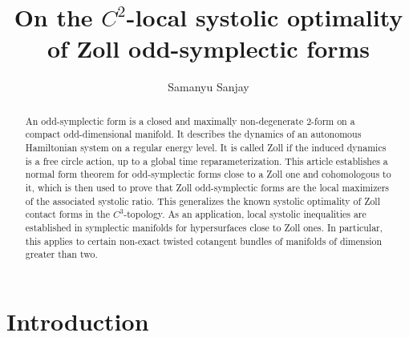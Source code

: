 \documentclass[11pt]{amsart}
\title[Systolic inequalities for odd-symplectic forms]{On the $C^2$-local systolic optimality of Zoll odd-symplectic forms}
\author{Samanyu Sanjay}
\theoremstyle{plain}
\theoremstyle{definition}
\theoremstyle{remark}
\begin{document}
\begin{abstract}
An odd-symplectic form is a closed and maximally non-degenerate $2$-form on a compact odd-dimensional manifold. It describes the dynamics of an autonomous Hamiltonian system on a regular energy level. It is called Zoll if the induced dynamics is a free circle action, up to a global time reparameterization. This article establishes a normal form theorem for odd-symplectic forms close to a Zoll one and cohomologous to it, which is then used to prove that Zoll odd-symplectic forms are the local maximizers of the associated systolic ratio. This generalizes the known systolic optimality of Zoll contact forms in the $C^3$-topology. As an application, local systolic inequalities are established in symplectic manifolds for hypersurfaces close to Zoll ones. In particular, this applies to certain non-exact twisted cotangent bundles of manifolds of dimension greater than two.
\end{abstract}

\maketitle


\section{Introduction}
\end{document}
